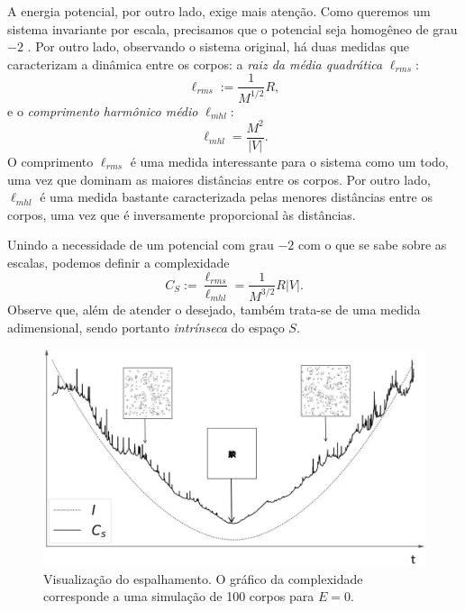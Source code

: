 A energia potencial, por outro lado, exige mais atenção. Como queremos um sistema invariante por escala, precisamos que o potencial seja homogêneo de grau $-2$ \citep[5]{Barbour2013_scaleanomaly}. Por outro lado, observando o sistema original, há duas medidas que caracterizam a dinâmica entre os corpos: a \textit{raiz da média quadrática} $\ell_{rms}$:
\begin{equation*}
    \ell_{rms} := \dfrac{1}{M^{1/2}} R,
\end{equation*}
e o \textit{comprimento harmônico médio} $\ell_{mhl}$:
\begin{equation}
    \ell_{mhl} = \dfrac{M^2}{|V|}.
\end{equation}
O comprimento $\ell_{rms}$ é uma medida interessante para o sistema como um todo, uma vez que dominam as maiores distâncias entre os corpos. Por outro lado, $\ell_{mhl}$ é uma medida bastante caracterizada pelas menores distâncias entre os corpos, uma vez que é inversamente proporcional às distâncias.

Unindo a necessidade de um potencial com grau $-2$ com o que se sabe sobre as escalas, podemos definir a complexidade
\begin{equation}
    C_S := \dfrac{\ell_{rms}}{\ell_{mhl}} = \dfrac{1}{M^{3/2}} R |V|.
\end{equation}
Observe que, além de atender o desejado, também trata-se de uma medida adimensional, sendo portanto \textit{intrínseca} do espaço $S$.

\begin{figure}
    \centering
    \includegraphics[width=0.5\linewidth]{tcc//img/complexidade.jpg}
    \caption{Visualização do espalhamento. O gráfico da complexidade corresponde a uma simulação de 100 corpos para $E=0$.}
    \label{fig:exemplo_espalhamento}
\end{figure}



